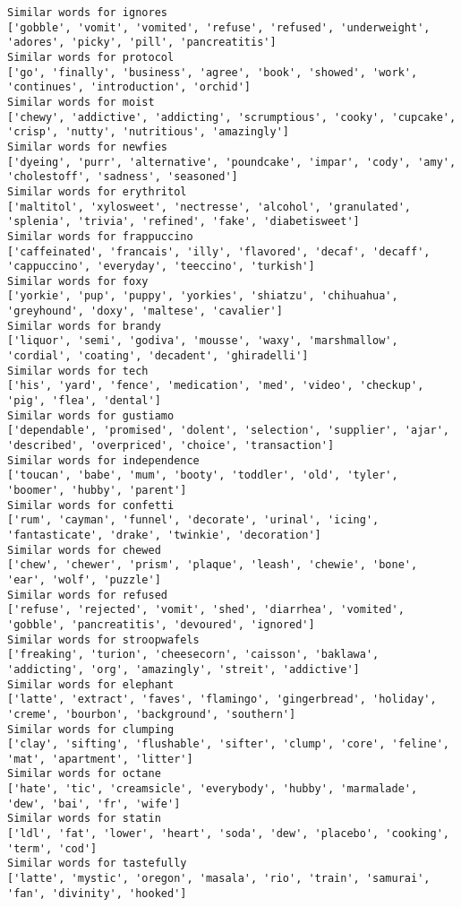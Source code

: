 \documentclass[11pt]{article}
\begin{document}
\begin{Verbatim}[commandchars=\\\{\}]
Similar words for ignores
['gobble', 'vomit', 'vomited', 'refuse', 'refused', 'underweight', 'adores', 'picky', 'pill', 'pancreatitis']
Similar words for protocol
['go', 'finally', 'business', 'agree', 'book', 'showed', 'work', 'continues', 'introduction', 'orchid']
Similar words for moist
['chewy', 'addictive', 'addicting', 'scrumptious', 'cooky', 'cupcake', 'crisp', 'nutty', 'nutritious', 'amazingly']
Similar words for newfies
['dyeing', 'purr', 'alternative', 'poundcake', 'impar', 'cody', 'amy', 'cholestoff', 'sadness', 'seasoned']
Similar words for erythritol
['maltitol', 'xylosweet', 'nectresse', 'alcohol', 'granulated', 'splenia', 'trivia', 'refined', 'fake', 'diabetisweet']
Similar words for frappuccino
['caffeinated', 'francais', 'illy', 'flavored', 'decaf', 'decaff', 'cappuccino', 'everyday', 'teeccino', 'turkish']
Similar words for foxy
['yorkie', 'pup', 'puppy', 'yorkies', 'shiatzu', 'chihuahua', 'greyhound', 'doxy', 'maltese', 'cavalier']
Similar words for brandy
['liquor', 'semi', 'godiva', 'mousse', 'waxy', 'marshmallow', 'cordial', 'coating', 'decadent', 'ghiradelli']
Similar words for tech
['his', 'yard', 'fence', 'medication', 'med', 'video', 'checkup', 'pig', 'flea', 'dental']
Similar words for gustiamo
['dependable', 'promised', 'dolent', 'selection', 'supplier', 'ajar', 'described', 'overpriced', 'choice', 'transaction']
Similar words for independence
['toucan', 'babe', 'mum', 'booty', 'toddler', 'old', 'tyler', 'boomer', 'hubby', 'parent']
Similar words for confetti
['rum', 'cayman', 'funnel', 'decorate', 'urinal', 'icing', 'fantasticate', 'drake', 'twinkie', 'decoration']
Similar words for chewed
['chew', 'chewer', 'prism', 'plaque', 'leash', 'chewie', 'bone', 'ear', 'wolf', 'puzzle']
Similar words for refused
['refuse', 'rejected', 'vomit', 'shed', 'diarrhea', 'vomited', 'gobble', 'pancreatitis', 'devoured', 'ignored']
Similar words for stroopwafels
['freaking', 'turion', 'cheesecorn', 'caisson', 'baklawa', 'addicting', 'org', 'amazingly', 'streit', 'addictive']
Similar words for elephant
['latte', 'extract', 'faves', 'flamingo', 'gingerbread', 'holiday', 'creme', 'bourbon', 'background', 'southern']
Similar words for clumping
['clay', 'sifting', 'flushable', 'sifter', 'clump', 'core', 'feline', 'mat', 'apartment', 'litter']
Similar words for octane
['hate', 'tic', 'creamsicle', 'everybody', 'hubby', 'marmalade', 'dew', 'bai', 'fr', 'wife']
Similar words for statin
['ldl', 'fat', 'lower', 'heart', 'soda', 'dew', 'placebo', 'cooking', 'term', 'cod']
Similar words for tastefully
['latte', 'mystic', 'oregon', 'masala', 'rio', 'train', 'samurai', 'fan', 'divinity', 'hooked']

\end{Verbatim}
\end{document}
